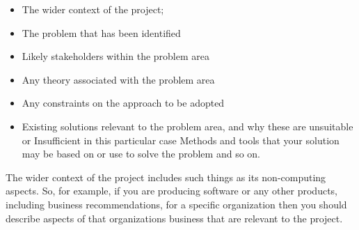 \begin{itemize}
    \item The wider context of the project;
    \item The problem that has been identified
    \item Likely stakeholders within the problem area
    \item Any theory associated with the problem area
    \item Any constraints on the approach to be adopted
    \item Existing solutions relevant to the problem area, and why these are unsuitable or Insufficient in this particular case Methods and tools that your solution may be based on or use to solve the problem and so on.
\end{itemize}
The wider context of the project includes such things as its non-computing aspects. So, for
example, if you are producing software or any other products, including business recommendations, for a specific organization then you should describe aspects of that organizations business that are relevant to the project.

